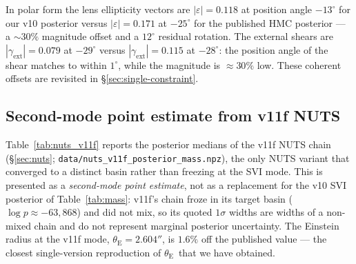 \documentclass[11pt,letterpaper]{article}
\newcommand{\thetaE}{\ensuremath{\theta_{\mathrm{E}}}}
\newcommand{\gext}{\ensuremath{\gamma_{\mathrm{ext}}}}
\begin{document}
In polar form the lens ellipticity vectors are
$|\varepsilon|=0.118$ at position angle $-13^{\circ}$ for our v10
posterior versus $|\varepsilon|=0.171$ at $-25^{\circ}$ for the
published HMC posterior --- a $\sim 30\%$ magnitude offset and a
$12^{\circ}$ residual rotation. The external shears are
$|\gext|=0.079$ at $-29^{\circ}$ versus $|\gext|=0.115$ at $-28^{\circ}$:
the position angle of the shear matches to within $1^{\circ}$, while
the magnitude is $\approx 30\%$ low. These coherent offsets are
revisited in \S\ref{sec:single-constraint}.

\subsection{Second-mode point estimate from v11f NUTS}
\label{sec:nuts_v11f_results}

Table~\ref{tab:nuts_v11f} reports the posterior medians of the v11f
NUTS chain (\S\ref{sec:nuts}; \texttt{data/nuts\_v11f\_posterior\_mass.npz}),
the only NUTS variant that converged to a distinct basin rather than
freezing at the SVI mode. This is presented as a {\it second-mode
point estimate}, not as a replacement for the v10 SVI posterior of
Table~\ref{tab:mass}: v11f's chain froze in its target basin
($\log p\approx-63{,}868$) and did not mix, so its quoted $1\sigma$
widths are widths of a non-mixed chain and do not represent marginal
posterior uncertainty. The Einstein radius at the v11f mode,
$\thetaE=2.604''$, is $1.6\%$ off the published value --- the closest
single-version reproduction of \thetaE\ that we have obtained.
\end{document}
